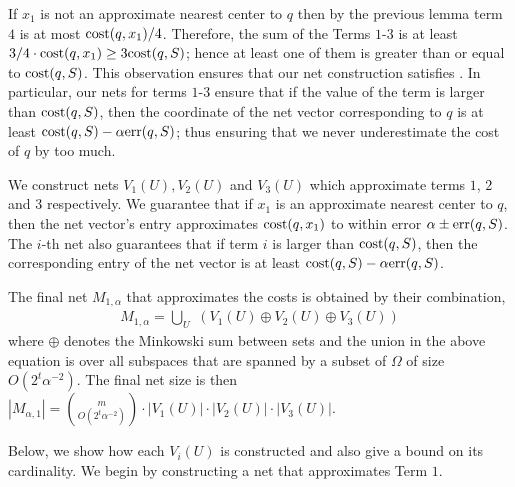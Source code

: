 \documentclass[11pt]{article}
\theoremstyle{restate}
\theoremstyle{definition}
\newcommand{\cost}{\textnormal{cost}}
\newcommand{\err}{\textnormal{err}}
\begin{document}
If $x_1$ is not an approximate nearest center  to $q$ then by the previous lemma term $4$ is at most $\cost(q,x_1)/4$. Therefore, the sum of the Terms $1$-$3$ is at least $3/4 \cdot  \cost(q,x_1) \geq 3 \cost(q,S)$; hence at least one of them is greater than or equal to $\cost(q,S)$. This observation ensures that our net construction satisfies  . In particular, our nets for terms $1$-$3$ ensure that if the value of the term is larger than $\cost(q,S)$, then the coordinate of the net vector corresponding to $q$ is at least $\cost(q,S) - \alpha \err(q,S)$; thus ensuring that we never underestimate the cost of $q$ by too much. 


We construct nets $V_1(U), V_2(U)$ and $V_3(U)$ which approximate terms $1$, $2$ and $3$ respectively. We guarantee that if $x_1$ is an approximate nearest center to $q$, then the net vector's entry approximates $\cost(q,x_1)$ to within error $\alpha \pm \err(q,S)$. The $i$-th net also guarantees that if term $i$ is larger than $\cost(q,S)$, then the corresponding entry of the net vector is at least $\cost(q,S) -\alpha \err(q,S)$.

 The final net $M_{1, \alpha}$ that approximates the costs is obtained by their combination, 
\begin{align} \label{eq: mink-sum}M_{1,\alpha} =  \bigcup\limits_{U} \,\, (V_1(U) \oplus V_2(U) \oplus V_3(U))
\end{align}
where $\oplus$ denotes the Minkowski sum between sets and the union in the above equation is over all subspaces that are spanned by a subset of $\Omega$ of size $O(2^t \alpha^{-2})$. The final net size is then $|M_{\alpha,1}| =  \binom{m}{O(2^t\alpha^{-2})} \cdot |V_1(U)| \cdot |V_2(U)| \cdot |V_3(U)|$.


Below, we show how each $V_i(U)$ is constructed and also give a bound on its cardinality. We begin by constructing a net that approximates Term $1$. 
\end{document}
